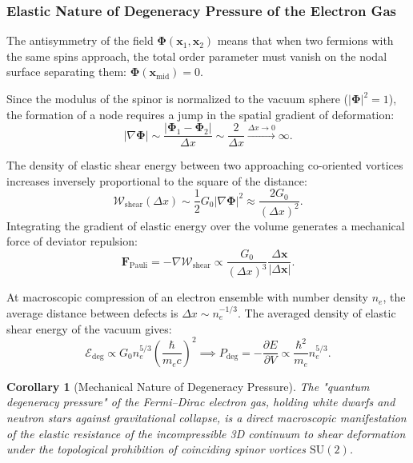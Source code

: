 \documentclass[12pt,a4paper]{article}
\newtheorem{corollary}{Corollary}
\begin{document}
	\subsubsection{Elastic Nature of Degeneracy Pressure of the Electron Gas}
	The antisymmetry of the field $\boldsymbol{\Phi}(\mathbf{x}_1, \mathbf{x}_2)$ means that when two fermions with the same spins approach, the total order parameter must vanish on the nodal surface separating them: $\boldsymbol{\Phi}(\mathbf{x}_{\text{mid}}) = 0$.
									
	Since the modulus of the spinor is normalized to the vacuum sphere ($|\boldsymbol{\Phi}|^2 = 1$), the formation of a node requires a jump in the spatial gradient of deformation:
	\begin{equation}
	|\nabla \boldsymbol{\Phi}| \sim \frac{|\boldsymbol{\Phi}_1 - \boldsymbol{\Phi}_2|}{\Delta x} \sim \frac{2}{\Delta x} \xrightarrow{\Delta x \to 0} \infty.
	\end{equation}
									
	The density of elastic shear energy between two approaching co-oriented vortices increases inversely proportional to the square of the distance:
	\begin{equation}
	\mathcal{W}_{\text{shear}}(\Delta x) \sim \frac{1}{2} G_0 |\nabla \boldsymbol{\Phi}|^2 \approx \frac{2 G_0}{(\Delta x)^2}.
	\end{equation}
	Integrating the gradient of elastic energy over the volume generates a mechanical force of deviator repulsion:
	\begin{equation}
	\mathbf{F}_{\text{Pauli}} = -\nabla \mathcal{W}_{\text{shear}} \propto \frac{G_0}{(\Delta x)^3} \frac{\Delta \mathbf{x}}{|\Delta \mathbf{x}|}.
	\end{equation}
									
	At macroscopic compression of an electron ensemble with number density $n_e$, the average distance between defects is $\Delta x \sim n_e^{-1/3}$. The averaged density of elastic shear energy of the vacuum gives:
	\begin{equation}
	\mathcal{E}_{\text{deg}} \propto G_0 n_e^{5/3} \left( \frac{\hbar}{m_e c} \right)^2 \implies P_{\text{deg}} = -\frac{\partial E}{\partial V} \propto \frac{\hbar^2}{m_e} n_e^{5/3}.
	\end{equation}
								
	\begin{corollary}[Mechanical Nature of Degeneracy Pressure]
	The "quantum degeneracy pressure" of the Fermi--Dirac electron gas, holding white dwarfs and neutron stars against gravitational collapse, is a direct macroscopic manifestation of the elastic resistance of the incompressible 3D continuum to shear deformation under the topological prohibition of coinciding spinor vortices $\mathrm{SU}(2)$.
	\end{corollary}
									
\end{document}
